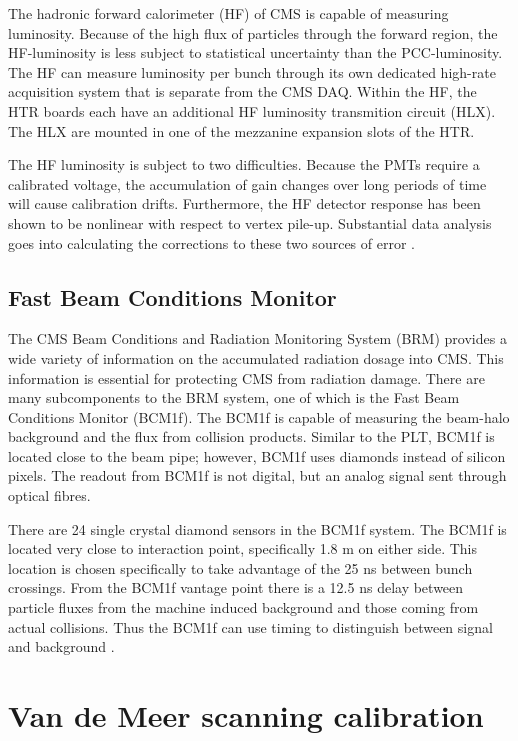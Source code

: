The hadronic forward calorimeter (HF) of CMS is capable of measuring luminosity. Because of the high flux of particles through the forward region, the HF-luminosity is less subject to statistical uncertainty than the PCC-luminosity. The HF can measure luminosity per bunch through its own dedicated high-rate acquisition system that is separate from the CMS DAQ. Within the HF, the HTR boards each have an additional HF luminosity transmition circuit (HLX). The HLX are mounted in one of the mezzanine expansion slots of the HTR.

The HF luminosity is subject to two difficulties. Because the PMTs require a calibrated voltage, the accumulation of gain changes over long periods of time will cause calibration drifts. Furthermore, the HF detector response has been shown to be nonlinear with respect to vertex pile-up. Substantial data analysis goes into calculating the corrections to these two sources of error \cite{CMS:2013gfa}.  

\subsection{Fast Beam Conditions Monitor}

The CMS Beam Conditions and Radiation Monitoring System (BRM) provides a wide variety of information on the accumulated radiation dosage into CMS. This information is essential for protecting CMS from radiation damage. There are many subcomponents to the BRM system, one of which is the Fast Beam Conditions Monitor (BCM1f). The BCM1f is capable of measuring the beam-halo background and the flux from collision products. Similar to the PLT, BCM1f is located close to the beam pipe; however, BCM1f uses diamonds instead of silicon pixels. The readout from BCM1f is not digital, but an analog signal sent through optical fibres. 

There are 24 single crystal diamond sensors in the BCM1f system. The BCM1f is located very close to interaction point, specifically 1.8 m on either side. This location is chosen specifically to take advantage of the 25 ns between bunch crossings. From the BCM1f vantage point there is a 12.5 ns delay between particle fluxes from the machine induced background and those coming from actual collisions. Thus the BCM1f can use timing to distinguish between signal and background \cite{Guthoff:2017ibf}.  

\section{Van de Meer scanning calibration}

